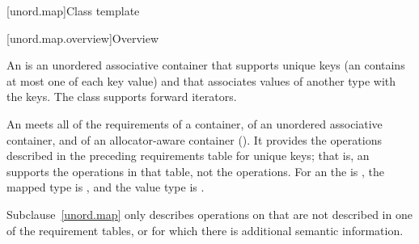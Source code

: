 [unord.map]{Class template }%

[unord.map.overview]{Overview}

\pnum
{}%
%
An  is an unordered associative container that
supports unique keys (an  contains at most one of each
key value) and that associates values of another type
 with the keys.
The  class
supports forward iterators.

\pnum
An  meets all of the requirements of a container, of an unordered associative container, and of an allocator-aware container (). It provides the operations described in the preceding requirements table for unique keys; that is, an  supports the  operations in that table, not the  operations. For an  the  is , the mapped type is , and the value type is .

\pnum
Subclause~\ref{unord.map} only describes operations on  that
are not described in one of the requirement tables, or for which there
is additional semantic information.

